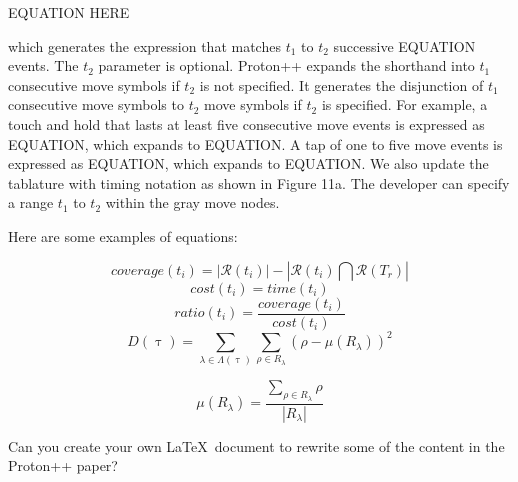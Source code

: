 \documentclass[11pt]{article}
\begin{document}
EQUATION HERE

which generates the expression that matches $t_1$ to $t_2$ successive EQUATION events. The $t_2$ parameter is optional. Proton++ expands the shorthand into $t_1$ consecutive move symbols if $t_2$ is not specified. It generates the disjunction of $t_1$ consecutive move symbols to $t_2$ move symbols if $t_2$ is specified. For example, a touch and hold that lasts at least five consecutive move events is expressed as EQUATION, which expands to EQUATION. A tap of one to five move events is expressed as EQUATION, which expands to EQUATION. We also update the tablature with timing notation as shown in Figure 11a. The developer can specify a range $t_1$ to $t_2$ within the gray move nodes.


Here are some examples of equations:

\begin{equation}
 coverage(t_i) = |\mathcal{R}(t_i)| - |\mathcal{R}(t_i) \bigcap
 \mathcal{R}(T_r)|
\label{eq:cov}
\end{equation}
\vspace{-12pt}
\begin{equation}
 cost(t_i) = time(t_i)
\label{eq:cost}
\end{equation}
\vspace{-12pt}
\begin{equation}
 ratio(t_i) = \frac{coverage(t_i)}{cost(t_i)}
\label{eq:ratio}
\end{equation}
\begin{equation}
D(\uptau) = \sum_{\lambda \in \Lambda(\uptau)}\sum_{\rho \in R_\lambda}
\left( \rho - \mu(R_\lambda) \right)^2 
\label{eq:deviance}
\end{equation}

\begin{equation}
\mu(R_\lambda) = \frac{\displaystyle{\sum_{\rho \in R_\lambda}} \rho}
                {|R_\lambda|} 
\label{eq:deviancemean}
\end{equation}

Can you create your own \LaTeX~document to rewrite some of the content in the Proton++ paper?
\end{document}
